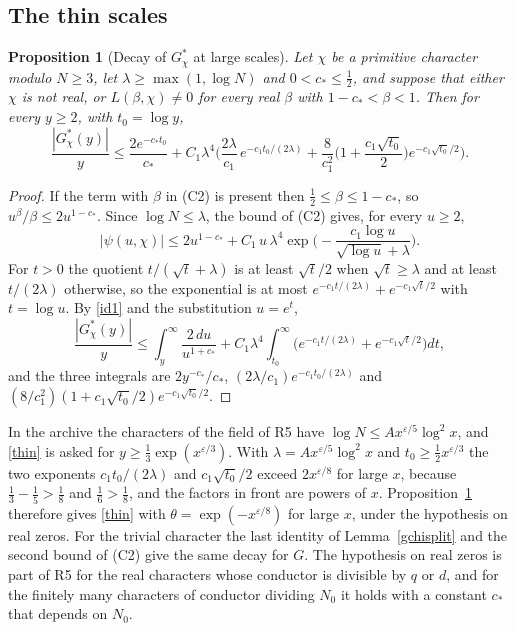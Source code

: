 \documentclass[11pt,letterpaper]{article}
\newtheorem{proposition}[theorem]{Proposition}
\numberwithin{equation}{section}
\begin{document}
\subsection{The thin scales}

\begin{proposition}[Decay of $G^\ast_\chi$ at large scales]\label{thinprop}
Let $\chi$ be a primitive character modulo $N\ge3$, let $\lambda\ge\max(1,\log N)$ and $0<c_\ast\le\tfrac12$, and suppose that either $\chi$ is not real, or $L(\beta,\chi)\ne0$ for every real $\beta$ with $1-c_\ast<\beta<1$. Then for every $y\ge2$, with $t_0=\log y$,
\[
\frac{|G^\ast_\chi(y)|}{y}\le\frac{2e^{-c_\ast t_0}}{c_\ast}+C_1\lambda^4\Big(\frac{2\lambda}{c_1}\,e^{-c_1t_0/(2\lambda)}+\frac8{c_1^2}\Big(1+\frac{c_1\sqrt{t_0}}2\Big)e^{-c_1\sqrt{t_0}/2}\Big).
\]
\end{proposition}
\begin{proof}
If the term with $\beta$ in (C2) is present then $\tfrac12\le\beta\le1-c_\ast$, so $u^\beta/\beta\le2u^{1-c_\ast}$. Since $\log N\le\lambda$, the bound of (C2) gives, for every $u\ge2$,
\[
|\psi(u,\chi)|\le2u^{1-c_\ast}+C_1\,u\,\lambda^4\exp\Big(-\frac{c_1\log u}{\sqrt{\log u}+\lambda}\Big).
\]
For $t>0$ the quotient $t/(\sqrt t+\lambda)$ is at least $\sqrt t/2$ when $\sqrt t\ge\lambda$ and at least $t/(2\lambda)$ otherwise, so the exponential is at most $e^{-c_1t/(2\lambda)}+e^{-c_1\sqrt t/2}$ with $t=\log u$. By \eqref{id1} and the substitution $u=e^t$,
\[
\frac{|G^\ast_\chi(y)|}y\le\int_y^\infty\frac{2\,du}{u^{1+c_\ast}}+C_1\lambda^4\int_{t_0}^\infty\Big(e^{-c_1t/(2\lambda)}+e^{-c_1\sqrt t/2}\Big)dt ,
\]
and the three integrals are $2y^{-c_\ast}/c_\ast$, $(2\lambda/c_1)e^{-c_1t_0/(2\lambda)}$ and $(8/c_1^2)(1+c_1\sqrt{t_0}/2)e^{-c_1\sqrt{t_0}/2}$.
\end{proof}

In the archive the characters of the field of R5 have $\log N\le Ax^{\varepsilon/5}\log^2x$, and \eqref{thin} is asked for $y\ge\tfrac13\exp(x^{\varepsilon/3})$. With $\lambda=Ax^{\varepsilon/5}\log^2x$ and $t_0\ge\tfrac12x^{\varepsilon/3}$ the two exponents $c_1t_0/(2\lambda)$ and $c_1\sqrt{t_0}/2$ exceed $2x^{\varepsilon/8}$ for large $x$, because $\tfrac13-\tfrac15>\tfrac18$ and $\tfrac16>\tfrac18$, and the factors in front are powers of $x$. Proposition~\ref{thinprop} therefore gives \eqref{thin} with $\theta=\exp(-x^{\varepsilon/8})$ for large $x$, under the hypothesis on real zeros. For the trivial character the last identity of Lemma~\ref{gchisplit} and the second bound of (C2) give the same decay for $G$. The hypothesis on real zeros is part of R5 for the real characters whose conductor is divisible by $q$ or $d$, and for the finitely many characters of conductor dividing $N_0$ it holds with a constant $c_\ast$ that depends on $N_0$.
\end{document}
